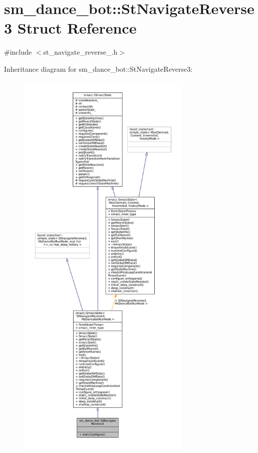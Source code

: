 \hypertarget{structsm__dance__bot_1_1StNavigateReverse3}{}\section{sm\+\_\+dance\+\_\+bot\+:\+:St\+Navigate\+Reverse3 Struct Reference}
\label{structsm__dance__bot_1_1StNavigateReverse3}


{\ttfamily \#include $<$st\+\_\+navigate\+\_\+reverse\+\_.\+h$>$}



Inheritance diagram for sm\+\_\+dance\+\_\+bot\+:\+:St\+Navigate\+Reverse3\+:
\nopagebreak
\begin{figure}[H]
\begin{center}
\leavevmode
\includegraphics[height=550pt]{structsm__dance__bot_1_1StNavigateReverse3__inherit__graph}
\end{center}
\end{figure}


